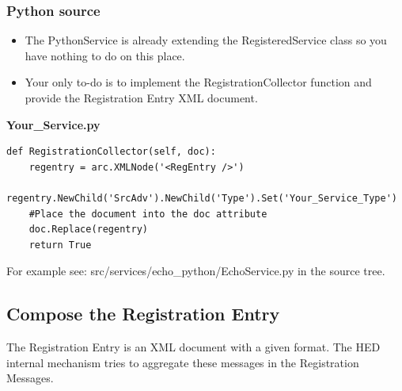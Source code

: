 \subsubsection{Python source}
\begin{itemize}
\item The PythonService is already extending the RegisteredService class so you have nothing to do on this place.
\item Your only to-do is to implement the RegistrationCollector function and provide the Registration Entry XML document.
\end{itemize}
\textbf{Your\_Service.py}
\begin{verbatim}
def RegistrationCollector(self, doc):
    regentry = arc.XMLNode('<RegEntry />')
    regentry.NewChild('SrcAdv').NewChild('Type').Set('Your_Service_Type') 
    #Place the document into the doc attribute
    doc.Replace(regentry)
    return True
\end{verbatim}
For example see: src/services/echo\_python/EchoService.py in the source tree.

\subsection{Compose the Registration Entry}
\label{Compose the Registration Entry}
The Registration Entry is an XML document with a given format. The HED internal mechanism tries to aggregate these messages in the Registration Messages.


